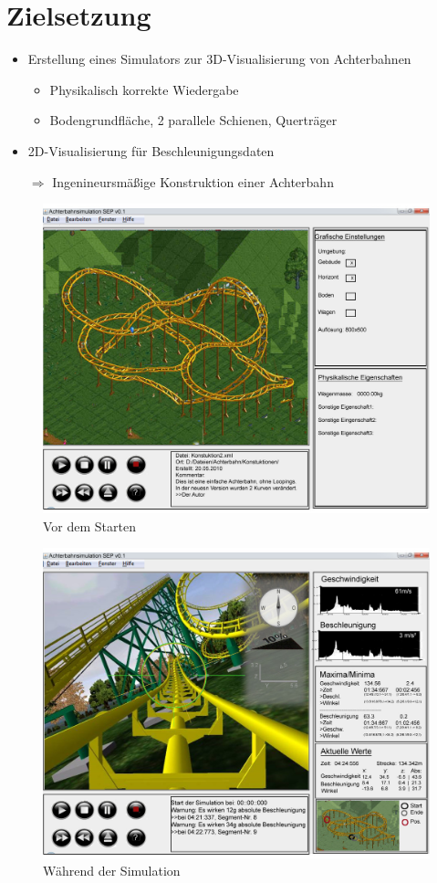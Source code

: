 \chapter{Zielsetzung}

\begin{itemize}
	\item Erstellung eines Simulators zur 3D-Visualisierung von Achterbahnen
		\begin{itemize}
			\item Physikalisch korrekte Wiedergabe
			\item Bodengrundfläche, 2 parallele Schienen, Querträger 
		\end{itemize}
	\item 2D-Visualisierung für Beschleunigungsdaten
	\item[$\Rightarrow$] Ingenineursmäßige Konstruktion einer Achterbahn
\end{itemize}

\begin{figure}[!h]
	\includegraphics[width=\linewidth]{bilder/GUI_v3}
	\caption{Vor dem Starten}
\end{figure}
\begin{figure}[!h]
	\includegraphics[width=\linewidth]{bilder/GUI_v2}
	\caption{Während der Simulation}
\end{figure}